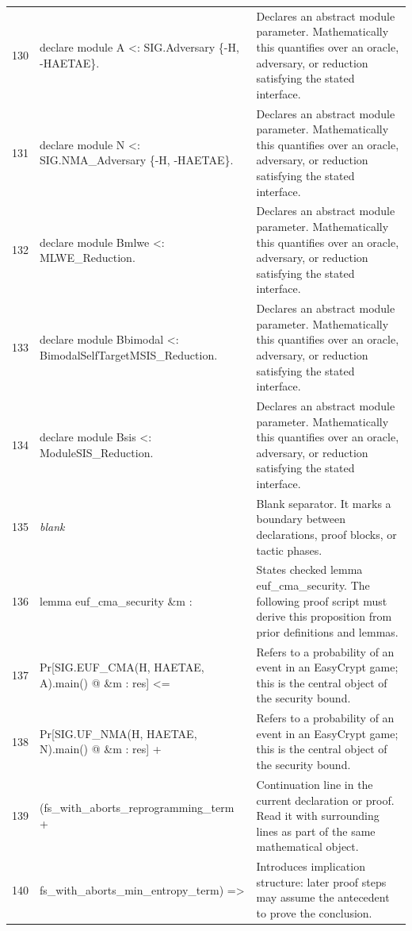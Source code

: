 \documentclass[10pt]{article}
\begin{document}
\begin{longtable}{r L{0.53\textwidth} L{0.37\textwidth}}
130 & {\ttfamily\scriptsize declare module A <: SIG.Adversary \{-H, -HAETAE\}.} & Declares an abstract module parameter.  Mathematically this quantifies over an oracle, adversary, or reduction satisfying the stated interface. \\
131 & {\ttfamily\scriptsize declare module N <: SIG.NMA\_Adversary \{-H, -HAETAE\}.} & Declares an abstract module parameter.  Mathematically this quantifies over an oracle, adversary, or reduction satisfying the stated interface. \\
132 & {\ttfamily\scriptsize declare module Bmlwe <: MLWE\_Reduction.} & Declares an abstract module parameter.  Mathematically this quantifies over an oracle, adversary, or reduction satisfying the stated interface. \\
133 & {\ttfamily\scriptsize declare module Bbimodal <: BimodalSelfTargetMSIS\_Reduction.} & Declares an abstract module parameter.  Mathematically this quantifies over an oracle, adversary, or reduction satisfying the stated interface. \\
134 & {\ttfamily\scriptsize declare module Bsis <: ModuleSIS\_Reduction.} & Declares an abstract module parameter.  Mathematically this quantifies over an oracle, adversary, or reduction satisfying the stated interface. \\
135 & {\ttfamily\scriptsize \emph{blank}} & Blank separator.  It marks a boundary between declarations, proof blocks, or tactic phases. \\
136 & {\ttfamily\scriptsize lemma euf\_cma\_security \&m :} & States checked lemma euf\_cma\_security.  The following proof script must derive this proposition from prior definitions and lemmas. \\
137 & {\ttfamily\scriptsize   Pr[SIG.EUF\_CMA(H, HAETAE, A).main() @ \&m : res] <=} & Refers to a probability of an event in an EasyCrypt game; this is the central object of the security bound. \\
138 & {\ttfamily\scriptsize     Pr[SIG.UF\_NMA(H, HAETAE, N).main() @ \&m : res] +} & Refers to a probability of an event in an EasyCrypt game; this is the central object of the security bound. \\
139 & {\ttfamily\scriptsize     (fs\_with\_aborts\_reprogramming\_term +} & Continuation line in the current declaration or proof.  Read it with surrounding lines as part of the same mathematical object. \\
140 & {\ttfamily\scriptsize       fs\_with\_aborts\_min\_entropy\_term) =>} & Introduces implication structure: later proof steps may assume the antecedent to prove the conclusion. \\

\end{longtable}
\end{document}

